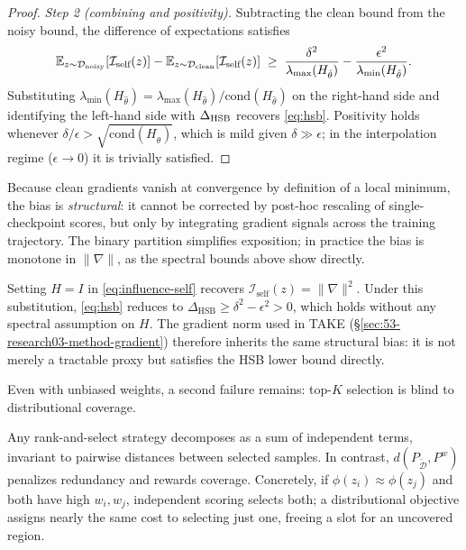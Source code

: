 \begin{foldable}
\begin{proof}
        \textit{Step 2 (combining and positivity).}
        Subtracting the clean bound from the noisy bound, the difference of expectations satisfies
        \begin{equation}
            \mathbb{E}_{z \sim \mathcal{D}_\textup{noisy}}[\mathcal{I}_\textup{self}(z)] - \mathbb{E}_{z \sim \mathcal{D}_\textup{clean}}[\mathcal{I}_\textup{self}(z)]
            \;\geq\; \frac{\delta^2}{\lambda_{\max}(H_{\hat\theta})} - \frac{\epsilon^2}{\lambda_{\min}(H_{\hat\theta})}.
        \end{equation}
        Substituting $\lambda_{\min}(H_{\hat\theta}) = \lambda_{\max}(H_{\hat\theta})/\text{cond}(H_{\hat\theta})$ on the right-hand side and identifying the left-hand side with $\Delta_\textup{HSB}$ recovers \eqref{eq:hsb}.
        Positivity holds whenever $\delta/\epsilon > \sqrt{\text{cond}(H_{\hat\theta})}$, which is mild given $\delta \gg \epsilon$; in the interpolation regime ($\epsilon \to 0$) it is trivially satisfied.
    \end{proof}
    Because clean gradients vanish at convergence by definition of a local minimum, the bias is \textit{structural}: it cannot be corrected by post-hoc rescaling of single-checkpoint scores, but only by integrating gradient signals across the training trajectory.
    The binary partition simplifies exposition; in practice the bias is monotone in $\|\nabla\|$, as the spectral bounds above show directly.
    \begin{remark} \label{rem:grad-norm}
        Setting $H = I$ in \eqref{eq:influence-self} recovers $\mathcal{I}_\text{self}(z) = \|\nabla\|^2$.
        Under this substitution, \eqref{eq:hsb} reduces to $\Delta_\text{HSB} \geq \delta^2 - \epsilon^2 > 0$, which holds without any spectral assumption on $H$.
        The gradient norm used in TAKE (\S\ref{sec:53-research03-method-gradient}) therefore inherits the same structural bias: it is not merely a tractable proxy but satisfies the \ac{HSB} lower bound directly.
    \end{remark}
\end{foldable}

\begin{foldable} %
    Even with unbiased weights, a second failure remains: top-$K$ selection is blind to distributional coverage.
    \begin{remark} \label{rem:coverage}
        Any rank-and-select strategy decomposes as a sum of independent terms, invariant to pairwise distances between selected samples.
        In contrast, $d(P_{\tilde{\mathcal{D}}}, P^w)$ penalizes redundancy and rewards coverage.
        Concretely, if $\phi(z_i) \approx \phi(z_j)$ and both have high $w_i, w_j$, independent scoring selects both; a distributional objective assigns nearly the same cost to selecting just one, freeing a slot for an uncovered region.
    \end{remark}
\end{foldable}

